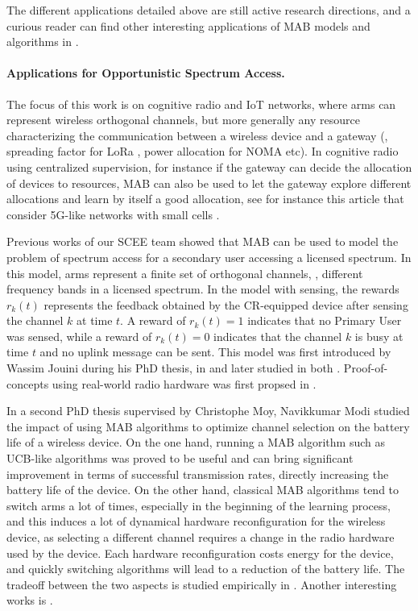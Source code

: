 The different applications detailed above are still active research directions,
and a curious reader can find other interesting applications of MAB models and algorithms in \cite{bouneffouf2019survey}.


\paragraph{Applications for Opportunistic Spectrum Access.}

The focus of this work is on cognitive radio and IoT networks, where arms can represent wireless orthogonal channels, but more generally any resource characterizing the communication between a wireless device and a gateway (\eg, spreading factor for LoRa \cite{KerkoucheAlami18}, power allocation for NOMA etc). In cognitive radio using centralized supervision, for instance if the gateway can decide the allocation of devices to resources, MAB can also be used to let the gateway explore different allocations and learn by itself a good allocation, see for instance this article that consider 5G-like networks with small cells \cite{Maghsudi16}.

Previous works of our SCEE team showed that MAB can be used to model the problem of spectrum access for a secondary user accessing a licensed spectrum.
In this model, arms represent a finite set of orthogonal channels, \ie, different frequency bands in a licensed spectrum.
In the model with sensing, the rewards $r_k(t)$ represents the feedback obtained by the CR-equipped device after sensing the channel $k$ at time $t$.
A reward of $r_k(t) = 1$ indicates that no Primary User was sensed, while a reward of $r_k(t)=0$ indicates that the channel $k$ is busy at time $t$ and no uplink message can be sent.
%
This model was first introduced by Wassim Jouini during his PhD thesis,
in \cite{Jouini09} and later studied in both \cite{Jouini10,Jouini12}.
Proof-of-concepts using real-world radio hardware was first propsed in \cite{MoyWSR2014,RobertSDR2014}.

In a second PhD thesis supervised by Christophe Moy, Navikkumar Modi studied the impact
of using MAB algorithms to optimize channel selection
on the battery life of a wireless device.
On the one hand, running a MAB algorithm such as UCB-like algorithms was proved to be useful and can bring significant improvement in terms of successful transmission rates, directly increasing the battery life of the device.
On the other hand, classical MAB algorithms tend to switch arms a lot of times, especially in the beginning of the learning process, and this induces a lot of dynamical hardware reconfiguration for the wireless device, as selecting a different channel requires a change in the radio hardware used by the device.
Each hardware reconfiguration costs energy for the device, and quickly switching algorithms will lead to a reduction of the battery life.
The tradeoff between the two aspects is studied empirically in
\cite{modiDemo2016}.
%
Another interesting works is \cite{Modi17QoS}.


